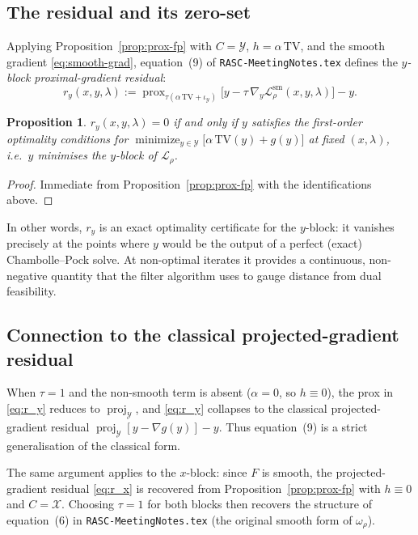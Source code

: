 \documentclass[11pt]{article}
\newcommand{\proj}{\operatorname{proj}}
\newcommand{\prox}{\operatorname{prox}}
\newcommand{\TV}{\mathrm{TV}}
\newcommand{\mini}{\mathop{\mathrm{minimize}}}
\theoremstyle{plain}
\newtheorem{proposition}{Proposition}
\theoremstyle{remark}
\begin{document}
\subsection{The residual and its zero-set}

Applying Proposition~\ref{prop:prox-fp} with $C = \mathcal{Y}$,
$h = \alpha\,\TV$, and the smooth gradient \eqref{eq:smooth-grad}, equation~(9)
of \texttt{RASC-MeetingNotes.tex} defines the \emph{$y$-block
proximal-gradient residual}:
\begin{equation}\label{eq:r_y}
  r_y(x,y,\lambda)
  := \prox_{\tau(\alpha\,\TV + \iota_{\mathcal{Y}})}\!\bigl[
       y - \tau\,\nabla_y \mathcal{L}^{\mathrm{sm}}_\rho(x,y,\lambda)
     \bigr] - y.
\end{equation}

\begin{proposition}\label{prop:ry-zero}
  $r_y(x,y,\lambda) = 0$ if and only if $y$ satisfies the first-order
  optimality conditions for $\mini_{y\in\mathcal{Y}}
  \bigl[\alpha\,\TV(y) + g(y)\bigr]$ at fixed $(x,\lambda)$,
  i.e.\ $y$ minimises the $y$-block of $\mathcal{L}_\rho$.
\end{proposition}
\begin{proof}
  Immediate from Proposition~\ref{prop:prox-fp} with the identifications above.
\end{proof}

In other words, $r_y$ is an exact optimality certificate for the $y$-block:
it vanishes precisely at the points where $y$ would be the output of a perfect
(exact) Chambolle--Pock solve.  At non-optimal iterates it provides a
continuous, non-negative quantity that the filter algorithm uses to gauge
distance from dual feasibility.

\subsection{Connection to the classical projected-gradient residual}

When $\tau = 1$ and the non-smooth term is absent ($\alpha = 0$, so
$h \equiv 0$), the prox in \eqref{eq:r_y} reduces to $\proj_{\mathcal{Y}}$,
and \eqref{eq:r_y} collapses to the classical projected-gradient residual
$\proj_{\mathcal{Y}}[y - \nabla g(y)] - y$.  Thus equation~(9) is a strict
generalisation of the classical form.

The same argument applies to the $x$-block: since $F$ is smooth, the
projected-gradient residual \eqref{eq:r_x} is recovered from
Proposition~\ref{prop:prox-fp} with $h \equiv 0$ and $C = \mathcal{X}$.
Choosing $\tau = 1$ for both blocks then recovers the structure of
equation~(6) in \texttt{RASC-MeetingNotes.tex} (the original smooth form
of $\omega_\rho$).
\end{document}
